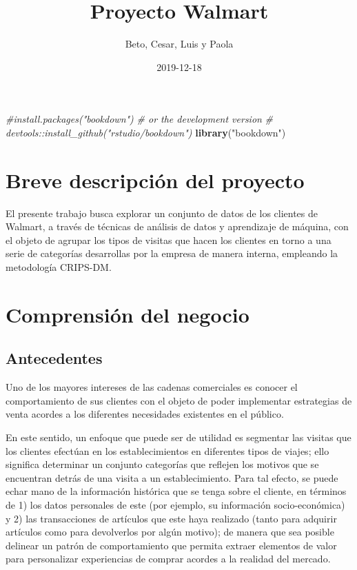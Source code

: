 \documentclass[]{book}
\title{Proyecto Walmart}
\author{Beto, Cesar, Luis y Paola}
\date{2019-12-18}
\newenvironment{Shaded}{\begin{snugshade}}{\end{snugshade}}
\newcommand{\CommentTok}[1]{\textcolor[rgb]{0.56,0.35,0.01}{\textit{#1}}}
\newcommand{\KeywordTok}[1]{\textcolor[rgb]{0.13,0.29,0.53}{\textbf{#1}}}
\newcommand{\NormalTok}[1]{#1}
\newcommand{\StringTok}[1]{\textcolor[rgb]{0.31,0.60,0.02}{#1}}
\begin{document}
\maketitle

{
\setcounter{tocdepth}{1}
\tableofcontents
}
\begin{Shaded}
\begin{Highlighting}[]
\CommentTok{#install.packages("bookdown")}
\CommentTok{# or the development version}
\CommentTok{# devtools::install_github("rstudio/bookdown")}
\KeywordTok{library}\NormalTok{(}\StringTok{"bookdown"}\NormalTok{)}
\end{Highlighting}
\end{Shaded}

\hypertarget{breve-descripciuxf3n-del-proyecto}{%
\chapter{Breve descripción del proyecto}\label{breve-descripciuxf3n-del-proyecto}}

El presente trabajo busca explorar un conjunto de datos de los clientes de Walmart, a través de técnicas de análisis de datos y aprendizaje de máquina, con el objeto de agrupar los tipos de visitas que hacen los clientes en torno a una serie de categorías desarrollas por la empresa de manera interna, empleando la metodología CRIPS-DM.

\hypertarget{comprensiuxf3n-del-negocio}{%
\chapter{Comprensión del negocio}\label{comprensiuxf3n-del-negocio}}

\hypertarget{antecedentes}{%
\section{Antecedentes}\label{antecedentes}}

Uno de los mayores intereses de las cadenas comerciales es conocer el comportamiento de sus clientes con el objeto de poder implementar estrategias de venta acordes a los diferentes necesidades existentes en el público.

En este sentido, un enfoque que puede ser de utilidad es segmentar las visitas que los clientes efectúan en los establecimientos en diferentes tipos de viajes; ello significa determinar un conjunto categorías que reflejen los motivos que se encuentran detrás de una visita a un establecimiento. Para tal efecto, se puede echar mano de la información histórica que se tenga sobre el cliente, en términos de 1) los datos personales de este (por ejemplo, su información socio-económica) y 2) las transacciones de artículos que este haya realizado (tanto para adquirir artículos como para devolverlos por algún motivo); de manera que sea posible delinear un patrón de comportamiento que permita extraer elementos de valor para personalizar experiencias de comprar acordes a la realidad del mercado.
\end{document}
